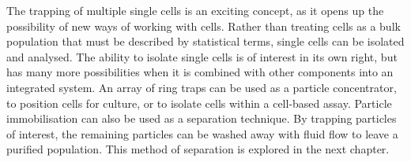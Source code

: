 The trapping of multiple single cells is an exciting concept, as it opens up the possibility of new ways of working with cells. Rather than treating cells as a bulk population that must be described by statistical terms, single cells can be isolated and analysed. The ability to isolate single cells is of interest in its own right, but has many more possibilities when it is combined with other components into an integrated system. An array of ring traps can be used as a particle concentrator, to position cells for culture, or to isolate cells within a cell-based assay. Particle immobilisation can also be used as a separation technique. By trapping particles of interest, the remaining particles can be washed away with fluid flow to leave a purified population. This method of separation is explored in the next chapter.